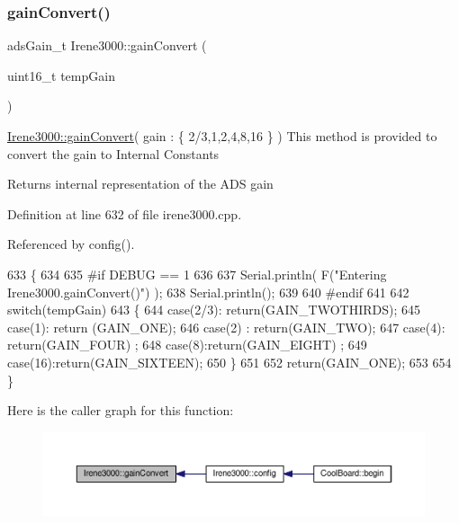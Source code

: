 \subsubsection{\texorpdfstring{gain\+Convert()}{gainConvert()}}
{\footnotesize\ttfamily ads\+Gain\+\_\+t Irene3000\+::gain\+Convert (\begin{DoxyParamCaption}\item[{uint16\+\_\+t}]{temp\+Gain }\end{DoxyParamCaption})}

\hyperlink{classIrene3000_abcad62d1201a59f8dd3ba87048002728}{Irene3000\+::gain\+Convert}( gain \+: \{ 2/3,1,2,4,8,16 \} ) This method is provided to convert the gain to Internal Constants

\begin{DoxyReturn}{Returns}
internal representation of the A\+DS gain 
\end{DoxyReturn}


Definition at line 632 of file irene3000.\+cpp.



Referenced by config().


\begin{DoxyCode}
633 \{
634 
635 \textcolor{preprocessor}{#if DEBUG == 1 }
636 
637     Serial.println( F(\textcolor{stringliteral}{"Entering Irene3000.gainConvert()"}) );
638     Serial.println();
639 
640 \textcolor{preprocessor}{#endif }
641     
642     \textcolor{keywordflow}{switch}(tempGain)
643     \{
644         \textcolor{keywordflow}{case}(2/3): \textcolor{keywordflow}{return}(GAIN\_TWOTHIRDS);
645         \textcolor{keywordflow}{case}(1): \textcolor{keywordflow}{return} (GAIN\_ONE);
646         \textcolor{keywordflow}{case}(2) : \textcolor{keywordflow}{return}(GAIN\_TWO);
647         \textcolor{keywordflow}{case}(4): \textcolor{keywordflow}{return}(GAIN\_FOUR) ;   
648         \textcolor{keywordflow}{case}(8):\textcolor{keywordflow}{return}(GAIN\_EIGHT)  ;  
649         \textcolor{keywordflow}{case}(16):\textcolor{keywordflow}{return}(GAIN\_SIXTEEN);  
650     \}
651 
652     \textcolor{keywordflow}{return}(GAIN\_ONE);
653 
654 \}
\end{DoxyCode}
Here is the caller graph for this function\+:\nopagebreak
\begin{figure}[H]
\begin{center}
\leavevmode
\includegraphics[width=350pt]{classIrene3000_abcad62d1201a59f8dd3ba87048002728_icgraph}
\end{center}
\end{figure}
\mbox{\label{classIrene3000_a7bc2414100b5e19eacc6630fa34b2654}} 
